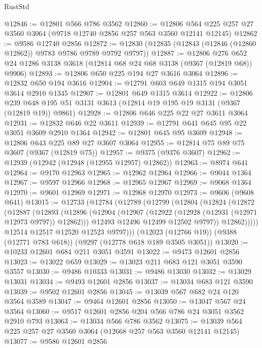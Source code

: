 \begin{lexlean}{RustStd}
\begin{coremodule}
@12846 := @12801 @566 @786 @3562
@12860 := @12806 @564 @225 @257 @27 @3560 @3064 (@9718 @12740 @2856 @257 @563 @3560 @12141 @12145)
@12862 := @9586 @12740 @2856
@12872 := @12830 (@12835 (@12843 (@12846 (@12860 @12862)) @9783 @9786 @9789 @9792 @9797))
@12887 := @12806
    @276
    @652
    @24
    @1286
    @3138
    @3618
    (@12814 @68 @24 @68 @3138 (@9367 (@12819 @68)) @9906)
@12893 := @12806 @650 @225 @194 @27 @3616 @3064
@12896 := @12832 @650 @194 @3616
@12904 := @12791 @603 @649 @1315 @194 @3051 @3614 @2910 @1345
@12907 := @12801 @649 @1315 @3614
@12922 := @12806
    @239
    @648
    @195
    @51
    @3131
    @3613
    (@12814 @19 @195 @19 @3131 (@9367 (@12819 @19)) @9861)
@12928 := @12806 @646 @225 @22 @27 @3611 @3064
@12931 := @12832 @646 @22 @3611
@12939 := @12791 @641 @645 @95 @22 @3051 @3609 @2910 @1364
@12942 := @12801 @645 @95 @3609
@12948 := @12806 @643 @225 @89 @27 @3607 @3064
@12955 := @12814 @75 @89 @75 @3607 (@9367 (@12819 @75))
@12957 := @9375 (@9376 @3607)
@12962 := @12939 (@12942 (@12948 (@12955 @12957) @12862))
@12963 := @8974 @641
@12964 := @9170 @12963
@12965 := @12962 @12964
@12966 := @9044 @1364
@12967 := @9597 @12966
@12968 := @12965 @12967
@12969 := @9068 @1364
@12970 := @9601 @12969
@12971 := @12968 @12970
@12973 := @9606 (@9608 @641)
@13015 := @12733
    (@12784
      (@12789
        (@12799
          (@12804
            (@12824
              (@12872
                (@12887
                  (@12893
                    (@12896
                      (@12904
                        (@12907 (@12922 (@12928 (@12931 (@12971 @12973 @9797)) @12862)))
                        @12493
                        @12496
                        @12499
                        @12502
                        @9797))
                    @12862)))))
          @12514
          @12517
          @12520
          @12523
          @9797)))
    (@12023 (@12766 @19))
    (@9388 (@12771 @783 @618))
    (@9297 (@12778 @618 @189 @3505 @3051))
@13020 := @10233 @12601 @684 @211 @3051 @3591
@13022 := @9473 @12601 @2856
@13023 := @13022 @659
@13029 := @13023 @211 @683 @121 @3051 @3590 @3557
@13030 := @9486 @10333
@13031 := @9486 @13030
@13032 := @13029 @13031
@13034 := @9493 @12601 @2856
@13037 := @13034 @683 @121 @3590
@13039 := @9502 @12601 @2856
@13045 := @13039 @567 @682 @24 @120 @3564 @3589
@13047 := @9464 @12601 @2856
@13050 := @13047 @567 @24 @3564
@13060 := @9517 @12601 @2856 @204 @566 @786 @24 @3051 @3562 @2910 @793
@13063 := @13034 @566 @786 @3562
@13075 := @13039 @564 @225 @257 @27 @3560 @3064 (@12668 @257 @563 @3560 @12141 @12145)
@13077 := @9586 @12601 @2856

\end{coremodule}
\end{lexlean}
